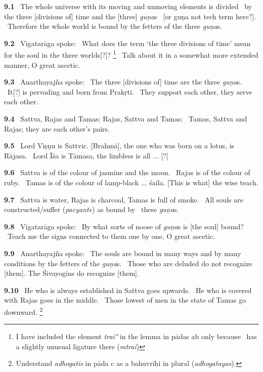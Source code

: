 \documentclass{article}
\newcommand{\skt}[1]{\textit{#1}}
\begin{document}
\textbf{9.1}%
\ The whole universe with its moving and unmoving elements is divided%
\                         by the three [divisions of] time and the [three] \skt{guṇa}s%
\                         [or guṇa not tech term here?].%
\ Therefore the whole world is bound by the fetters of the three \skt{guṇa}s.%


\textbf{9.2}%
\ Vigatarāga spoke:%
\ What does the term `the three divisions of time' mean for the soul in the three worlds[?]?%
\footnote{I have included the element \skt{trai°} in the lemma in pādas ab only because \msCc\                 has a slightly unusual ligature there (\skt{mtrai}) }%
\ Talk about it in a somewhat more extended manner, O great ascetic.%


\textbf{9.3}%
\ Anarthayajña spoke:%
\ The three [divisions of] time are the three \skt{guṇa}s.%
\                 It[?] is pervading and born from Prakṛti.%
\ They support each other, they serve each other.%


\textbf{9.4}%
\ Sattva, Rajas and Tamas; Rajas, Sattva and Tamas;%
\ Tamas, Sattva and Rajas; they are each other's pairs.%


\textbf{9.5}%
\ Lord Viṣṇu is Sattvic. [Brahmā], the one who was born on a lotus, is Rājasa.%
\ Lord Īśa is Tāmasa, the limbless is all ... [?]%


\textbf{9.6}%
\ Sattva is of the colour of jasmine and the moon.%
\                  Rajas is of the colour of ruby.%
\ Tamas is of the colour of lamp-black ... śaila. [This is what] the wise teach.%


\textbf{9.7}%
\ Sattva is water, Rajas is charcoal, Tamas is full of smoke.%
\ All souls are constructed/suffer (\skt{pacyante}) as bound by%
\                 these \skt{guṇa}s.%


\textbf{9.8}%
\ Vigatarāga spoke:%
\ By what sorts of noose of \skt{guṇa}s is [the soul] bound?%
\ Teach me the signs connected to them one by one, O great ascetic.%


\textbf{9.9}%
\ Anarthayajña spoke:%
\ The souls are bound in many ways and by many conditions by the fetters of the \skt{guṇa}s.%
\ Those who are deluded do not recognize [them]. The Śivayogins do recognize [them].%


\textbf{9.10}%
\ He who is always established in Sattva goes upwards.%
\                  He who is covered with Rajas goes in the middle.%
\ Those lowest of men in the state of Tamas go downward.%
\footnote{Understand \skt{adhogatis} in pāda c as a bahuvrīhi in plural (\skt{adhogatayas}). }%
\end{document}
